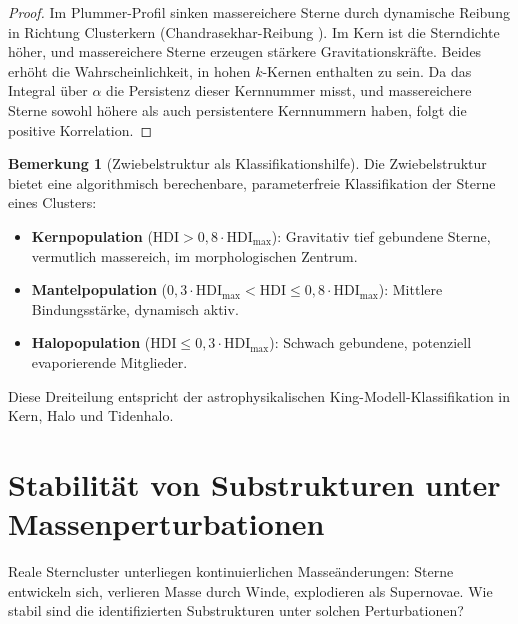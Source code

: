 ﻿\documentclass[a4paper,12pt]{report}
\theoremstyle{definition}
\newtheorem{bemerkung}{Bemerkung}
\begin{document}
\begin{proof}
Im Plummer-Profil sinken massereichere Sterne durch dynamische Reibung in Richtung Clusterkern (Chandrasekhar-Reibung \cite{chandrasekhar1943}). Im Kern ist die Sterndichte höher, und massereichere Sterne erzeugen stärkere Gravitationskräfte. Beides erhöht die Wahrscheinlichkeit, in hohen $k$-Kernen enthalten zu sein. Da das Integral über $\alpha$ die Persistenz dieser Kernnummer misst, und massereichere Sterne sowohl höhere als auch persistentere Kernnummern haben, folgt die positive Korrelation.
\end{proof}

\begin{bemerkung}[Zwiebelstruktur als Klassifikationshilfe]
Die Zwiebelstruktur bietet eine algorithmisch berechenbare, parameterfreie Klassifikation der Sterne eines Clusters:
\begin{itemize}
    \item \textbf{Kernpopulation} ($\mathrm{HDI} > 0{,}8 \cdot \mathrm{HDI}_\mathrm{max}$): Gravitativ tief gebundene Sterne, vermutlich massereich, im morphologischen Zentrum.
    \item \textbf{Mantelpopulation} ($0{,}3 \cdot \mathrm{HDI}_\mathrm{max} < \mathrm{HDI} \leq 0{,}8 \cdot \mathrm{HDI}_\mathrm{max}$): Mittlere Bindungsstärke, dynamisch aktiv.
    \item \textbf{Halopopulation} ($\mathrm{HDI} \leq 0{,}3 \cdot \mathrm{HDI}_\mathrm{max}$): Schwach gebundene, potenziell evaporierende Mitglieder.
\end{itemize}
Diese Dreiteilung entspricht der astrophysikalischen King-Modell-Klassifikation in Kern, Halo und Tidenhalo.
\end{bemerkung}

\section{Stabilität von Substrukturen unter Massenperturbationen}
\label{sec:stabilitaet}

Reale Sterncluster unterliegen kontinuierlichen Masseänderungen: Sterne entwickeln sich, verlieren Masse durch Winde, explodieren als Supernovae. Wie stabil sind die identifizierten Substrukturen unter solchen Perturbationen?
\end{document}
